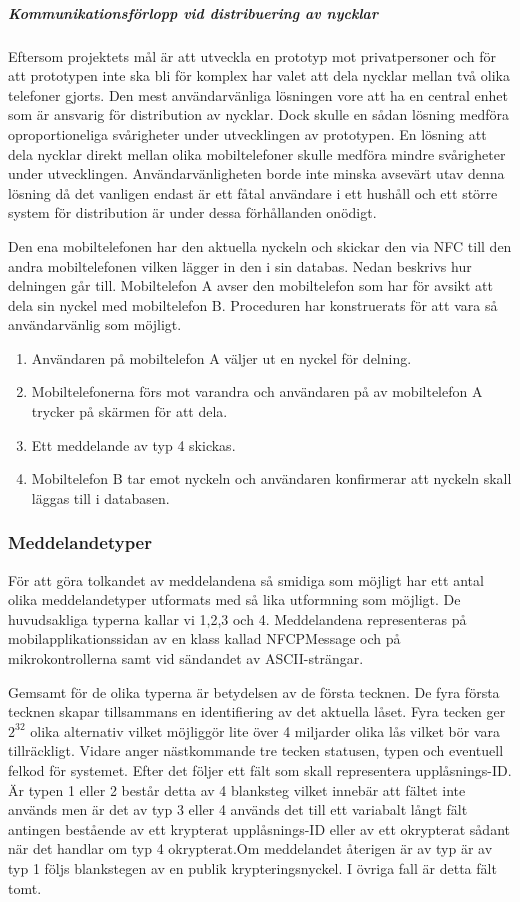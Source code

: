 \documentclass[11pt]{article}
\begin{document}
\subparagraph{Kommunikationsförlopp vid distribuering av nycklar
}
Eftersom projektets mål är att utveckla en prototyp mot privatpersoner och för att prototypen inte ska bli för komplex har valet att dela nycklar mellan två olika telefoner gjorts. Den mest användarvänliga lösningen vore att ha en central enhet som är ansvarig för distribution av nycklar. Dock skulle en sådan lösning medföra oproportioneliga svårigheter under utvecklingen av prototypen. En lösning att dela nycklar direkt mellan olika mobiltelefoner skulle medföra mindre svårigheter under utvecklingen. Användarvänligheten borde inte minska avsevärt utav denna lösning då det vanligen endast är ett fåtal användare i ett hushåll och ett större system för distribution är under dessa förhållanden onödigt.

Den ena mobiltelefonen har den aktuella nyckeln och skickar den via NFC till den andra mobiltelefonen vilken lägger in den i sin databas.  Nedan beskrivs hur delningen går till. Mobiltelefon A avser den mobiltelefon som har för avsikt att dela sin nyckel med mobiltelefon B. Proceduren har konstruerats för att vara så användarvänlig som möjligt.

\begin{enumerate}
\item Användaren på mobiltelefon A väljer ut en nyckel för delning.
\item Mobiltelefonerna förs mot varandra och användaren på av mobiltelefon A trycker på skärmen för att dela.
\item Ett meddelande av typ 4 skickas.
\item Mobiltelefon B tar emot nyckeln och användaren konfirmerar att nyckeln skall läggas till i databasen.
\end{enumerate}

\subsubsection{Meddelandetyper}
För att göra tolkandet av meddelandena så smidiga som möjligt har ett antal olika meddelandetyper utformats med så lika utformning som möjligt. De huvudsakliga typerna kallar vi 1,2,3 och 4. Meddelandena representeras på mobilapplikationssidan av en klass kallad NFCPMessage och på mikrokontrollerna samt vid sändandet av ASCII-strängar. 

Gemsamt för de olika typerna är betydelsen av de första tecknen. De fyra första tecknen skapar tillsammans en identifiering av det aktuella låset. Fyra tecken ger $2^{32} $ olika alternativ vilket möjliggör lite över 4 miljarder olika lås vilket bör vara tillräckligt. Vidare anger nästkommande tre tecken statusen, typen och eventuell felkod för systemet. Efter det följer ett fält som skall representera upplåsnings-ID. Är typen 1 eller 2 består detta av 4 blanksteg vilket innebär att fältet inte används men är det av typ 3 eller 4 används det till ett variabalt långt fält antingen bestående av ett krypterat upplåsnings-ID eller av ett okrypterat sådant när det handlar om typ 4 okrypterat.Om meddelandet återigen är av typ är av typ 1 följs blankstegen av en publik krypteringsnyckel. I övriga fall är detta fält tomt.
\end{document}
